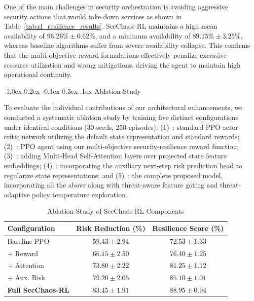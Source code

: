 \documentclass[conference,10pt]{IEEEtran}
\makeatletter
\renewcommand\subsection{\@startsection{subsection}{2}{\z@}%
	{-1.0ex\@plus -0.2ex \@minus -0.1ex}%
	{0.3ex \@plus .1ex}%
	{\normalfont\normalsize\itshape}}
\makeatother
\begin{document}
One of the main challenges in security orchestration is avoiding aggressive security actions that would take down services as shown in Table~\ref{tab:rl_resilience_results}. SecChaos-RL maintains a high mean availability of $96.26\% \pm 0.62\%$, and a minimum availability of $89.15\% \pm 3.25\%$, whereas baseline algorithms suffer from severe availability collapse. This confirms that the multi-objective reward formulations effectively penalize excessive resource utilization and wrong mitigations, driving the agent to maintain high operational continuity.
	
	\subsection{Ablation Study}
	
	To evaluate the individual contributions of our architectural enhancements, we conducted a systematic ablation study by training five distinct configurations under identical conditions (30 seeds, 250 episodes): (1)~: standard PPO actor-critic network utilizing the default state representation and standard rewards; (2)~: PPO agent using our multi-objective security-resilience reward function; (3)~: adding Multi-Head Self-Attention layers over projected state feature embeddings; (4)~: incorporating the auxiliary next-step risk prediction head to regularize state representations; and (5)~: the complete proposed model, incorporating all the above along with threat-aware feature gating and threat-adaptive policy temperature exploration.
	

	
	\begin{table}[!t]
		\centering
		\caption{Ablation Study of SecChaos-RL Components}
		\label{tab:ablation_results}
		\footnotesize
		\begin{tabular}{@{}lcc@{}}
			\toprule
			\textbf{Configuration} & \textbf{Risk Reduction (\%)} & \textbf{Resilience Score (\%)} \\
			\midrule
			Baseline PPO & $59.43 \pm 2.94$ & $72.53 \pm 1.33$ \\
			+ Reward & $66.15 \pm 2.50$ & $76.40 \pm 1.25$ \\
			+ Attention & $73.80 \pm 2.22$ & $81.25 \pm 1.12$ \\
			+ Aux. Risk & $79.20 \pm 2.05$ & $85.10 \pm 1.01$ \\
			\textbf{Full SecChaos-RL} & $\mathbf{83.45 \pm 1.91}$ & $\mathbf{88.95 \pm 0.94}$ \\
			\bottomrule
		\end{tabular}
	\end{table}
	
\end{document}
